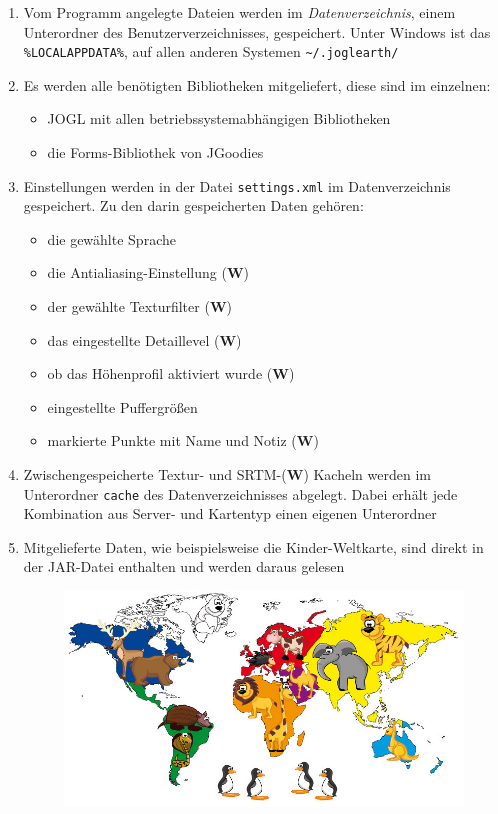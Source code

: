 \documentclass[10pt]{scrreprt}
\newcommand{\sfbf}[1]{\textbf{\sffamily #1}}
\newcommand{\W}{\sfbf{W}}
\begin{document}
\begin{enumerate}[leftmargin=2cm]
\item Vom Programm angelegte Dateien werden im \textit{Datenverzeichnis}, einem Unterordner des Benutzerverzeichnisses, gespeichert. Unter Windows ist das \texttt{\%LOCALAPPDATA\%}, auf allen anderen Systemen \texttt{\textasciitilde/.joglearth/}
\item Es werden alle benötigten Bibliotheken mitgeliefert, diese sind im einzelnen: 
\begin{itemize}
\item JOGL mit allen betriebssystemabhängigen Bibliotheken
\item die Forms-Bibliothek von JGoodies
\end{itemize}
\item Einstellungen werden in der Datei \texttt{settings.xml} im Datenverzeichnis gespeichert. Zu den darin gespeicherten Daten gehören:
\begin{itemize}
\item die gewählte Sprache
\item die Antialiasing-Einstellung (\W)
\item der gewählte Texturfilter (\W)
\item das eingestellte Detaillevel (\W)
\item ob das Höhenprofil aktiviert wurde (\W)
\item eingestellte Puffergrößen
\item markierte Punkte mit Name und Notiz (\W)
\end{itemize}
\item Zwischengespeicherte Textur- und SRTM-(\W) Kacheln werden im Unterordner \texttt{cache} des Datenverzeichnisses abgelegt. Dabei erhält jede Kombination aus Server- und Kartentyp einen eigenen Unterordner
\item Mitgelieferte Daten, wie beispielsweise die Kinder-Weltkarte, sind direkt in der JAR-Datei enthalten und werden daraus gelesen
\vspace{0.5cm}
\begin{figure}[!htb]
	\centering
	\includegraphics[scale=0.3]{Kinder-Weltkarte.jpg}
\end{figure}
\end{enumerate}
\end{document}
